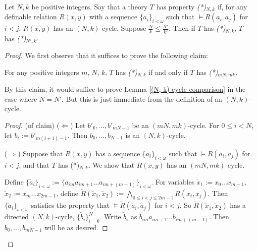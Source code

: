 \documentclass[10pt,a4paper]{amsart}
\begin{document}
\begin{lemma}\label{(N, k)-cycle comparison}
    Let $N, k$ be positive integers. Say that a theory $T$ has property \emph{(*)}$_{N, k}$ if, for any definable relation $R(x, y)$ with a sequence $\{a_{i}\}_{i < \omega}$ such that $\models R(a_{i}, a_{j})$ for $i <j$, $R(x, y)$ has an $(N, k)$-cycle. Suppose $\frac{N}{k} \leq \frac{N'}{k'}$. Then if $T$ has \emph{(*)}$_{N, k}$, $T$ has \emph{(*)}$_{N', k'}$ 
\end{lemma}

\begin{proof}
    We first observe that it suffices to prove the following claim:

    \begin{claim}\label{multiply numerator and denominator}
        For any positive integers $m$, $N$, $k$, $T$ has \emph{(*)}$_{N, k}$ if and only if $T$ has \emph{(*)}$_{mN, mk}$.
    \end{claim}

    By this claim, it would suffice to prove Lemma \ref{(N, k)-cycle comparison} in the case where $N = N'$. But this is just immediate from the definition of an $(N, k)$-cycle.

    \begin{proof}(of claim)
        ($\Leftarrow$) Let $b'_{0}, \ldots, b'_{mN-1}$ be an $(mN, mk)$-cycle. For $0 \leq i < N$, let $b_{i} := b'_{m(i+1) -1} $. Then $b_{0}, \ldots, b_{N-1}$ is an $(N, k)$-cycle.

        ($\Rightarrow$) Suppose that $R(x, y)$ has a sequence $\{a_{i}\}_{i < \omega}$ such that $\models R(a_{i}, a_{j})$ for $i <j$, and that $T$ has (*)$_{N, k}$. We show that $R(x, y)$ has an $(mN, mk)$-cycle.
        
        
        
        Define $\{\tilde{a}_{i}\}_{i < \omega} := \{a_{im}a_{im+1} \ldots a_{im+(m-1)} \}_{i < \omega} $. For variables $\tilde{x}_{1} := x_{0}\ldots x_{m-1} $, $\tilde{x}_{2} := x_{m} \ldots x_{2m-1}$, define $\tilde{R}(\tilde{x}_{1}, \tilde{x}_{2}) := \bigwedge_{0 \leq i < j \leq 2m -1} R(x_{i}, x_{j})$. Then $\{\tilde{a}_{i}\}_{i < \omega}$ satisfies the property that $\models \tilde{R}(\tilde{a}_{i}, \tilde{a}_{j})$ for $i < j$. So $\tilde{R}(\tilde{x}_{1}, \tilde{x}_{2})$ has a directed $(N, k)$-cycle, $\{\tilde{b}_{i}\}^{N}_{i = 0}$. Write $\tilde{b}_{i}$ as $b_{im}a_{im+1} \ldots b_{im+(m-1)}$. Then $b_{0}, \ldots, b_{mN -1} $ will be as desired.
    \end{proof}
\end{proof}
\end{document}
